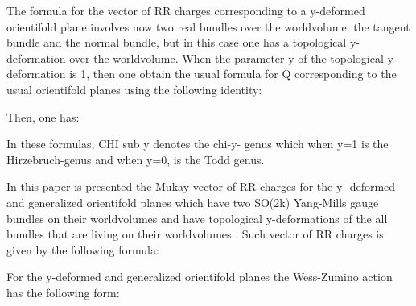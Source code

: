 \documentclass[a4paper,a4paper]{article}
\begin{document}
\begin{center}
{  \coordHE{} }
\end{center}
The formula for the vector of RR charges corresponding to a y-deformed orientifold plane involves now two real bundles over the worldvolume: the 
tangent bundle and  the normal bundle, but in this case one has a topological y-deformation over the worldvolume.
When the parameter y of the topological y-deformation is 1, then one obtain the usual formula for Q corresponding to the usual orientifold planes using the following identity:
\begin{center}
 
{  \coordHE{}}
\end{center} 
Then, one has:
\begin{center}
{  \coordHE{} }
\end{center}

\begin{center}
{  \coordHE{} }
\end{center}
In these formulas, CHI sub y  denotes the chi-y- genus which when y=1 is the Hirzebruch-genus and when y=0, is the Todd genus.

In this paper is presented the Mukay vector of RR charges for the  y- deformed and generalized orientifold planes which have two SO(2k) Yang-Mills gauge bundles on their worldvolumes and have topological y-deformations of the all bundles that are living on their worldvolumes .  Such vector of RR charges is given by the following formula:

\begin{center}
{  \coordHE{} }
\end{center}
For the y-deformed and generalized  orientifold planes the Wess-Zumino action has the following form:
\end{document}
